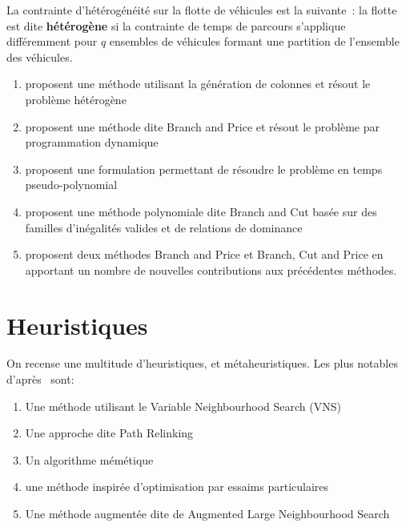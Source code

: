 \documentclass[a4paper]{scrartcl}
\begin{document}
La contrainte d'hétérogénéité sur la flotte de véhicules est la suivante~: la
flotte est dite \textbf{hétérogène} si la contrainte de temps de parcours
s'applique différemment pour $q$ ensembles de véhicules formant une partition
de l'ensemble des véhicules.

\begin{enumerate}
	\item \cite{butt.ryan_apr1999} proposent une méthode utilisant la génération
		de colonnes et résout le problème hétérogène
	\item \cite{boussier.etal_sep2007} proposent une méthode dite
		\foreignlanguage{UKenglish}{Branch and Price} et résout le
		problème par programmation dynamique
	\item \cite{poggi.etal_2010} proposent une formulation permettant de
		résoudre le problème en temps pseudo-polynomial
	\item \cite{dang.etal_may2013} proposent une méthode polynomiale dite
		\foreignlanguage{UKenglish}{Branch and Cut} basée sur des
		familles d'inégalités valides et de relations de dominance 
	\item \cite{keshtkaran.etal_jan2016} proposent deux méthodes
		\foreignlanguage{UKenglish}{Branch and Price} et
		\foreignlanguage{UKenglish}{Branch, Cut and Price} en apportant
		un nombre de nouvelles contributions aux précédentes méthodes.
\end{enumerate}

\section{Heuristiques}%
\label{sec:heuristiques}

On recense une multitude d'heuristiques, et métaheuristiques. Les plus notables
d'après~\parencite{keshtkaran.etal_jan2016} sont:

\begin{enumerate}
	\item Une méthode utilisant le \foreignlanguage{UKenglish}{Variable
		Neighbourhood Search} (VNS)~\parencite{archetti.etal_feb2007}
	\item Une approche dite \foreignlanguage{UKenglish}{Path
		Relinking}~\parencite{souffriau.etal_nov2010}
	\item Un algorithme mémétique~\parencite{bouly.etal_mar2010,dang.etal_2011}
	\item une méthode inspirée d'optimisation par essaims
		particulaires~\parencite{dang.etal_sep2013}
	\item Une méthode augmentée dite de \foreignlanguage{UKenglish}{Augmented Large
		Neighbourhood Search}~\parencite{kim.etal_jun2013}
\end{enumerate}
\end{document}
